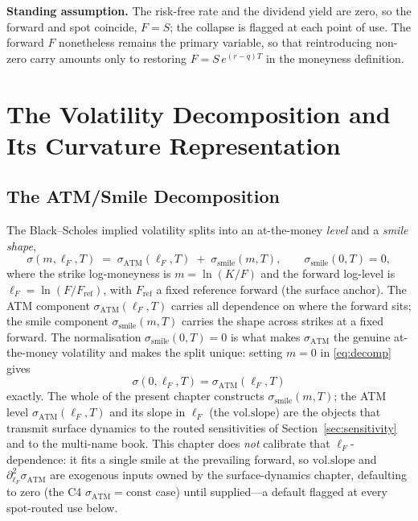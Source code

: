 \documentclass[11pt]{book}
\theoremstyle{plain}
\theoremstyle{definition}
\theoremstyle{remark}
\newcommand{\mln}{m}                             %
\newcommand{\lF}{\ell_F}                         %
\newcommand{\Fref}{F_{\mathrm{ref}}}             %
\newcommand{\ssm}{\sigma_{\mathrm{smile}}}       %
\newcommand{\satm}{\sigma_{\mathrm{ATM}}}        %
\newcommand{\volslope}{\mathrm{vol.slope}}       %
\begin{document}
\medskip
\noindent\textbf{Standing assumption.} The risk-free rate and the dividend
yield are zero, so the forward and spot coincide, $F=S$; the collapse is
flagged at each point of use. The forward $F$ nonetheless remains the primary
variable, so that reintroducing non-zero carry amounts only to restoring
$F = S\,e^{(r-q)T}$ in the moneyness definition.

\section{The Volatility Decomposition and Its Curvature Representation}
\label{sec:implied}

\subsection{The ATM/Smile Decomposition}
\label{sec:decomposition}

The Black--Scholes implied volatility splits into an at-the-money
\emph{level} and a \emph{smile shape},
\begin{equation}\label{eq:decomp}
\sigma(\mln,\lF,T) \;=\; \satm(\lF,T) \;+\; \ssm(\mln,T),
\qquad \ssm(0,T) = 0,
\end{equation}
where the strike log-moneyness is $\mln = \ln(K/F)$ and the forward log-level
is $\lF = \ln(F/\Fref)$, with $\Fref$ a fixed reference forward (the surface
anchor). The ATM component $\satm(\lF,T)$ carries all dependence on where the
forward sits; the smile component $\ssm(\mln,T)$ carries the shape across
strikes at a fixed forward. The normalisation $\ssm(0,T)=0$ is what makes
$\satm$ the genuine at-the-money volatility and makes the split unique: setting
$\mln = 0$ in \eqref{eq:decomp} gives
\begin{equation}\label{eq:atm-recovery}
\sigma(0,\lF,T) = \satm(\lF,T)
\end{equation}
exactly. The whole of the present chapter constructs $\ssm(\mln,T)$; the ATM
level $\satm(\lF,T)$ and its slope in $\lF$ (the $\volslope$) are the objects
that transmit surface dynamics to the routed sensitivities of
Section~\ref{sec:sensitivity} and to the multi-name book. This chapter does
\emph{not} calibrate that $\lF$-dependence: it fits a single smile at the
prevailing forward, so $\volslope$ and $\partial_{\lF}^2\satm$ are exogenous
inputs owned by the surface-dynamics chapter, defaulting to zero (the C4
$\satm=\mathrm{const}$ case) until supplied---a default flagged at every
spot-routed use below.
\end{document}
